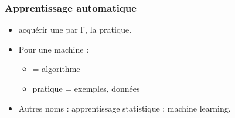 
\begin{frame}
  \frametitle{Apprentissage automatique}
  \begin{itemize}
  \item {}
    \pause
    acquérir une  par l', la pratique.
  \item Pour une  machine :
    \begin{itemize}
    \item {} = algorithme
    \item {} pratique = exemples, données
    \end{itemize}
    \pause
  \item Autres noms : apprentissage statistique ; machine learning.
  \end{itemize}
\end{frame}

